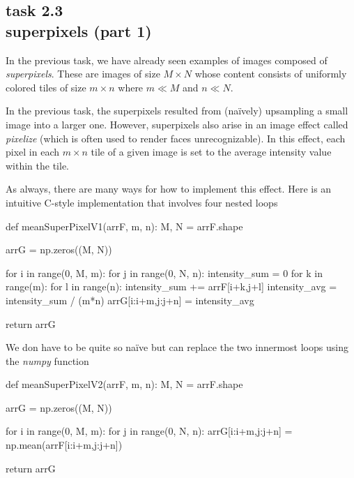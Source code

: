 
\subsection*{task 2.3 \\[1ex] superpixels (part 1)}

In the previous task, we have already seen examples of images composed of \emph{superpixels}. These are images of size $M \times N$ whose content consists of uniformly colored tiles of size $m \times n$ where $m \ll M$ and $n \ll N$.

In the previous task, the superpixels resulted from (na\"ively) upsampling a small image into a larger one. However, superpixels also arise in an image effect called \emph{pixelize} (which is often used to render faces unrecognizable). In this effect, each pixel in each $m \times n$ tile of a given image is set to the average intensity value within the tile.

\begin{figure}[h!]
 \hfill
{} \hfill
{} 
\end{figure}

\vfill
As always, there are many ways for how to implement this effect. Here is an intuitive C-style implementation that involves four nested  loops
\begin{python}[emph={meanSuperPixelV1,meanSuperPixelV2,meanSuperPixelV3,meanSuperPixelV4}]
def meanSuperPixelV1(arrF, m, n):
    M, N = arrF.shape
    
    arrG = np.zeros((M, N))

    for i in range(0, M, m):
        for j in range(0, N, n):
            intensity_sum = 0
            for k in range(m):
                for l in range(n):
                    intensity_sum += arrF[i+k,j+l]
            intensity_avg = intensity_sum / (m*n)
            arrG[i:i+m,j:j+n] = intensity_avg

    return arrG
\end{python}

\newpage
We don have to be quite so na\"ive but can replace the two innermost  loops using the \emph{numpy} function 
\begin{python}[emph={meanSuperPixelV1,meanSuperPixelV2,meanSuperPixelV3,meanSuperPixelV4}]
def meanSuperPixelV2(arrF, m, n):
    M, N = arrF.shape
    
    arrG = np.zeros((M, N))

    for i in range(0, M, m):
        for j in range(0, N, n):
            arrG[i:i+m,j:j+n] = np.mean(arrF[i:i+m,j:j+n])

    return arrG
\end{python}

